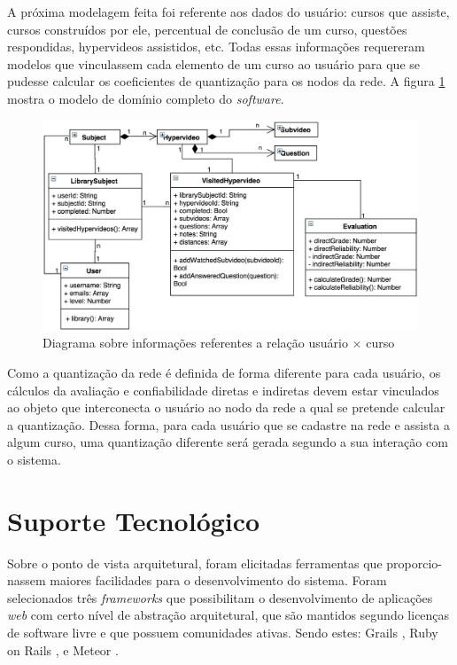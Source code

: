 A próxima modelagem feita foi referente aos dados do usuário: cursos que assiste, cursos construídos por ele, percentual de conclusão de um curso, questões respondidas, hypervideos assistidos, etc. Todas essas informações requereram modelos que vinculassem cada elemento de um curso ao usuário para que se pudesse calcular os coeficientes de quantização para os nodos da rede. A figura \ref{fig:userdata} mostra o modelo de domínio completo do \textit{software}.

\begin{figure}[h!]
	\centering
  	\includegraphics[width=.8\linewidth]{figuras/userdata.eps}
  	\caption{Diagrama sobre informações referentes a relação usuário \(\times\) curso}
  	\label{fig:userdata}
\end{figure}

Como a quantização da rede é definida de forma diferente para cada usuário, os cálculos da avaliação e confiabilidade diretas e indiretas devem estar vinculados ao objeto que interconecta o usuário ao nodo da rede a qual se pretende calcular a quantização. Dessa forma, para cada usuário que se cadastre na rede e assista a algum curso, uma quantização diferente será gerada segundo a sua interação com o sistema.

\section{Suporte Tecnológico}

Sobre o ponto de vista arquitetural, foram elicitadas ferramentas que proporcio- nassem maiores facilidades para o desenvolvimento do sistema. Foram selecionados três \textit{frameworks} que possibilitam o desenvolvimento de aplicações \textit{web} com certo nível de abstração arquitetural, que são mantidos segundo licenças de software livre e que possuem comunidades ativas. Sendo estes: Grails \cite{grails2015}, Ruby on Rails \cite{rubyrails2015}, e Meteor \cite{meteor2015}. 
\\
\\

